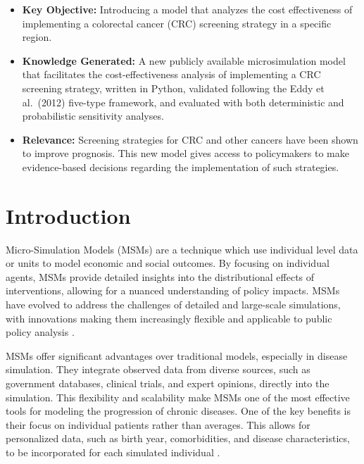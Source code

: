 \documentclass[sn-mathphys-num]{sn-jnl}%
\theoremstyle{thmstyleone}%
\theoremstyle{thmstyletwo}%
\theoremstyle{thmstylethree}%
\begin{document}
\begin{itemize}
    \item \textbf{Key Objective:} Introducing a model that analyzes the cost effectiveness of implementing a colorectal cancer (CRC) screening strategy in a specific region.

    \item \textbf{Knowledge Generated:} A new publicly available microsimulation model that facilitates the cost-effectiveness analysis of implementing a CRC screening strategy, written in Python, validated following the Eddy et al.\ (2012) five-type framework, and evaluated with both deterministic and probabilistic sensitivity analyses.

    \item \textbf{Relevance:} Screening strategies for CRC and other cancers have been shown to improve prognosis. This new model gives access to policymakers to make evidence-based decisions regarding the implementation of such strategies.
\end{itemize}

\section{Introduction}\label{sec1}

Micro-Simulation Models (MSMs) are a technique which use individual level data or units to model economic and social outcomes. By focusing on individual agents, MSMs provide detailed insights into the distributional effects of interventions, allowing for a nuanced understanding of policy impacts. MSMs have evolved to address the challenges of detailed and large-scale simulations, with innovations making them increasingly flexible and applicable to public policy analysis \cite{klevmarken_microsimulation_2022}. 

MSMs offer significant advantages over traditional models, especially in disease simulation. They integrate observed data from diverse sources, such as government databases, clinical trials, and expert opinions, directly into the simulation. This flexibility and scalability make MSMs one of the most effective tools for modeling the progression of chronic diseases. One of the key benefits is their focus on individual patients rather than averages. This allows for personalized data, such as birth year, comorbidities, and disease characteristics, to be incorporated for each simulated individual \cite{chrysanthopoulou_milc_2016}.
\end{document}
